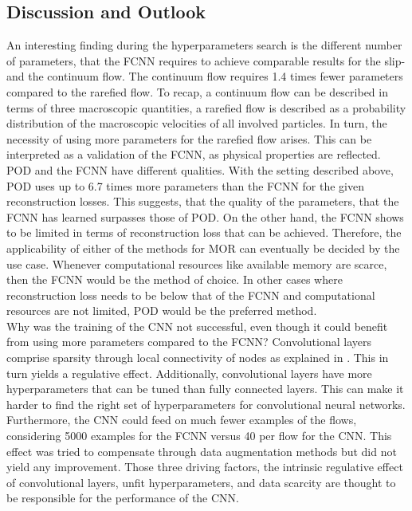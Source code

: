 \subsection{Discussion and Outlook}
An interesting finding during the hyperparameters search is the different number of parameters, that the FCNN requires to achieve comparable results for the slip- and the continuum flow. The continuum flow requires 1.4 times fewer parameters compared to the rarefied flow. To recap, a continuum flow can be described in terms of three macroscopic quantities, a rarefied flow is described as a probability distribution of the macroscopic velocities of all involved particles. In turn, the necessity of using more parameters for the rarefied flow arises. This can be interpreted as a validation of the FCNN, as physical properties are reflected.\\
POD and the FCNN have different qualities. With the setting described above, POD uses up to 6.7 times more parameters than the FCNN for the given reconstruction losses. This suggests, that the quality of the parameters, that the FCNN has learned surpasses those of POD. On the other hand, the FCNN shows to be limited in terms of reconstruction loss that can be achieved. Therefore, the applicability of either of the methods for MOR can eventually be decided by the use case. Whenever computational resources like available memory are scarce, then the FCNN would be the method of choice. In other cases where reconstruction loss needs to be below that of the FCNN and computational resources are not limited, POD would be the preferred method.\\
Why was the training of the CNN not successful, even though it could benefit from using more parameters compared to the FCNN? Convolutional layers comprise sparsity through local connectivity of nodes as explained in \cite{Goodfellow}. This in turn yields a regulative effect. Additionally, convolutional layers have more hyperparameters that can be tuned than fully connected layers. This can make it harder to find the right set of hyperparameters for convolutional neural networks. Furthermore, the CNN could feed on much fewer examples of the flows, considering 5000 examples for the FCNN versus 40 per flow for the CNN. This effect was tried to compensate through data augmentation methods but did not yield any improvement. Those three driving factors, the intrinsic regulative effect of convolutional layers, unfit hyperparameters, and data scarcity are thought to be responsible for the performance of the CNN.\\
